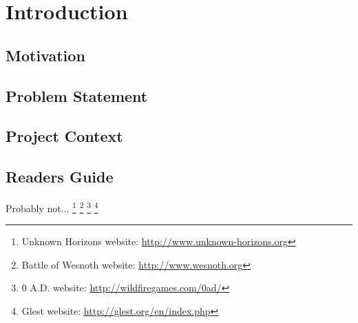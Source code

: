

\section{Introduction}

\subsection{Motivation}

\subsection{Problem Statement}

\subsection{Project Context}

\subsection{Readers Guide}
Probably  not...
\footnote{Unknown Horizons website: \url{http://www.unknown-horizons.org}}
\footnote{Battle of Wesnoth website: \url{http://www.wesnoth.org}}
\footnote{0 A.D. website: \url{http://wildfiregames.com/0ad/}}
\footnote{Glest website: \url{http://glest.org/en/index.php}}


